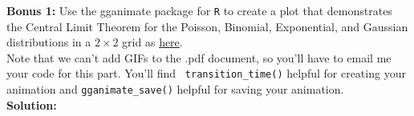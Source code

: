 \documentclass{article}\usepackage[]{graphicx}\usepackage[]{color}
\begin{document}
\newpage
\noindent \textbf{Bonus 1:} Use the gganimate package \citep{gganimate} for \texttt{R} to create a plot that demonstrates the Central Limit Theorem for the Poisson, Binomial, Exponential, and Gaussian distributions in a $2\times 2$ grid as \href{https://moodle.colgate.edu/mod/forum/discuss.php?d=127682}{here}.\\

Note that we can't add GIFs to the .pdf document, so you'll have to email me your code for this part. You'll find \texttt{  transition\_time()} helpful for creating your animation and \texttt{gganimate\_save()} helpful for saving your animation. \vspace{2em}\\
\textbf{Solution:}
\end{document}
